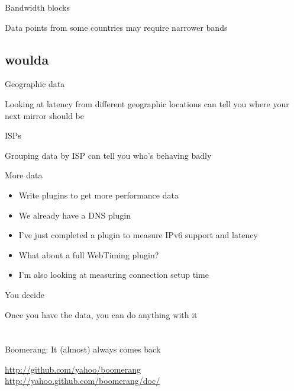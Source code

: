 \documentclass{beamer}
\begin{document}
\begin{frame}{Bandwidth blocks}
  \begin{center}
  Data points from some countries may require narrower bands
  \end{center}
\end{frame}

\subsection{woulda}
\begin{frame}{Geographic data}
  \begin{center}
  Looking at latency from different geographic locations can tell you where your next mirror should be
  \end{center}
\end{frame}

\begin{frame}{ISPs}
  \begin{center}
  Grouping data by ISP can tell you who's behaving badly
  \end{center}
\end{frame}

\begin{frame}{More data}
  \begin{itemize}
  \item Write plugins to get more performance data
  \item We already have a DNS plugin
  \item I've just completed a plugin to measure IPv6 support and latency
  \item What about a full WebTiming plugin?
  \item I'm also looking at measuring connection setup time
  \end{itemize}
\end{frame}

\begin{frame}{You decide}
  \begin{center}
  Once you have the data, you can do anything with it
  \end{center}
\end{frame}

\section{}

\begin{frame}{}
  \begin{center}
  Boomerang: It (almost) always comes back \\
  \parbox[c][1cm]{\paperwidth}{ }
  \tiny{
  \href{http://www.github.com/yahoo/boomerang/}{http://github.com/yahoo/boomerang} \\
  \href{http://yahoo.github.com/boomerang/doc/}{http://yahoo.github.com/boomerang/doc/}
  }
  \end{center}
\end{frame}
\end{document}
